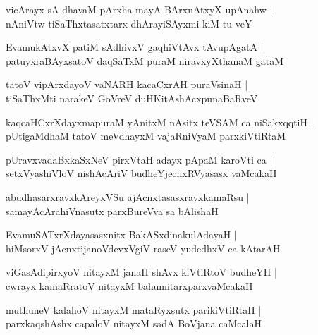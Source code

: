 \documentclass[twoside,12pt,openright]{book}
\newcounter{shloka}[chapter]
\begin{document}
\begin{shloka}%
vicArayx sA dhavaM pArxha mayA BArxnAtxyX upAnahw |\\
nAniVtw tiSaThxtasatxtarx dhArayiSAyxmi kiM tu veY
\end{shloka}

\begin{shloka}%
EvamukAtxvX patiM sAdhivxV gaqhiVtAvx tAvupAgatA |\\
patuyxraBAyxsatoV daqSaTxM puraM niravxyXthanaM gataM 
\end{shloka}

\begin{shloka}%
tatoV vipArxdayoV vaNARH kacaCxrAH puraVsinaH |\\
tiSaThxMti narakeV GoVreV duHKitAshAcxpunaBaRveV 
\end{shloka}

\begin{shloka}%
kaqcaHCxrXdayxmapuraM yAnitxM nAsitx teVSAM ca niSakxqqtiH |\\
pUtigaMdhaM tatoV meVdhayxM vajaRniVyaM parxkiVtiRtaM 
\end{shloka}

\begin{shloka}%
pUravxvadaBxkaSxNeV pirxVtaH adayx pApaM karoVti ca |\\
setxVyashiVloV nishAcAriV budheYjecnxRVyasasx vaMcakaH 
\end{shloka}

\begin{shloka}%
abudhasarxravxkAreyxVSu ajAcnxtasasxravxkamaRsu |\\
samayAcArahiVnasutx parxBureVva sa bAlishaH 
\end{shloka}

\begin{shloka}%
EvamuSATxrXdayasasxnitx BakASxdinakulAdayaH |\\
hiMsorxV jAcnxtijanoVdevxVgiV raseV yudedhxV ca kAtarAH 
\end{shloka}

\begin{shloka}%
viGasAdipirxyoV nitayxM janaH shAvx kiVtiRtoV budheYH |\\
cwrayx kamaRratoV nitayxM bahumitarxparxvaMcakaH 
\end{shloka}

\begin{shloka}%
muthuneV kalahoV nitayxM mataRyxsutx parikiVtiRtaH |\\
parxkaqshAshx capaloV nitayxM sadA BoVjana caMcalaH 
\end{shloka}
\end{document}
